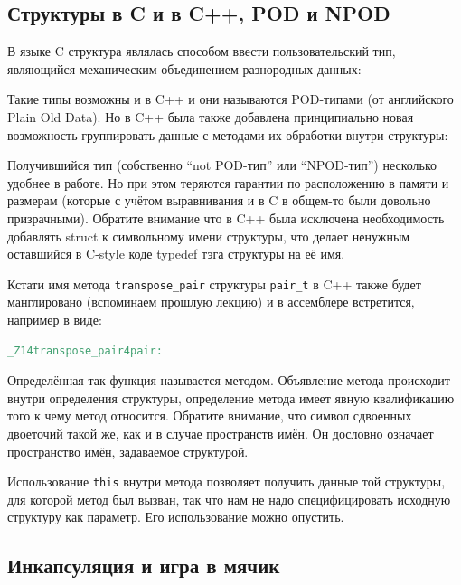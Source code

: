 \documentclass[a4paper,12pt,oneside]{article}
\begin{document}
\subsection{Структуры в C и в C++, POD и NPOD}

В языке C структура являлась способом ввести пользовательский тип, являющийся механическим объединением разнородных данных:



Такие типы возможны и в C++ и они называются POD-типами (от английского Plain Old Data). Но в C++ была также добавлена принципиально новая возможность группировать данные с методами их обработки внутри структуры:



Получившийся тип (собственно ``not POD-тип'' или ``NPOD-тип'') несколько удобнее в работе. Но при этом теряются гарантии по расположению в памяти и размерам (которые с учётом выравнивания и в C в общем-то были довольно призрачными). Обратите внимание что в C++ была исключена необходимость добавлять struct к символьному имени структуры, что делает ненужным оставшийся в C-style коде typedef тэга структуры на её имя.

Кстати имя метода \lstinline!transpose_pair! структуры \lstinline!pair_t! в C++ также будет манглировано (вспоминаем прошлую лекцию) и в ассемблере встретится, например в виде:

\begin{lstlisting}[language=make]
_Z14transpose_pair4pair:
\end{lstlisting}

Определённая так функция называется методом. Объявление метода происходит внутри определения структуры, определение метода имеет явную квалификацию того к чему метод относится. Обратите внимание, что символ сдвоенных двоеточий такой же, как и в случае пространств имён. Он дословно означает пространство имён, задаваемое структурой.

Использование \lstinline!this! внутри метода позволяет получить данные той структуры, для которой метод был вызван, так что нам не надо специфицировать исходную структуру как параметр. Его использование можно опустить.

\subsection{Инкапсуляция и игра в мячик}
\end{document}
